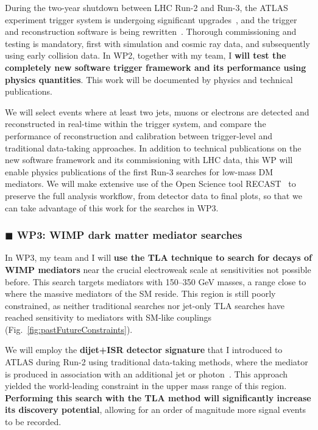 \documentclass[11pt,a4paper]{article}
\begin{document}
During the two-year shutdown between LHC Run-2 and Run-3, the ATLAS experiment trigger system is undergoing significant upgrades~\cite{Aad:1602235}, and the trigger and reconstruction software is being rewritten~\cite{Bielski:2674286}. %
Thorough commissioning and testing is mandatory, first with simulation and cosmic ray data, and subsequently using early collision data. 
In WP2, together with my team, I \textbf{will test the completely new software trigger framework and its performance using physics quantities}.
This work will be documented by physics and technical publications.  

We will select events where at least two jets, muons or electrons are detected and reconstructed in real-time within the trigger system, and compare the performance of reconstruction and calibration between trigger-level and traditional data-taking approaches. 
In addition to technical publications on the new software framework and its commissioning with LHC data, this WP will enable physics publications of the first Run-3 searches for low-mass DM mediators. 
We will make extensive use of the Open Science tool RECAST~\cite{Schuy:2019awp} to preserve the full analysis workflow, from detector data to final plots, so that we can take advantage of this work for the searches in WP3.  

\subsubsection*{\color{yellow} $\blacksquare$ \color{black} WP3: WIMP dark matter mediator searches}

In WP3, my team and I will \textbf{use the TLA technique to search for decays of WIMP mediators} near the crucial electroweak scale at sensitivities not possible before.
This search targets mediators with 150--350 GeV masses, a range close to where the massive mediators of the SM reside. This region is still poorly constrained, as neither traditional searches nor jet-only TLA searches have reached sensitivity to mediators with SM-like couplings (Fig.~\ref{fig:pastFutureConstraints}).  

We will employ the \textbf{dijet+ISR detector signature} that I introduced to ATLAS during Run-2 using traditional data-taking methods, where the mediator is produced in association with an additional jet or photon~\cite{Aaboud:2019zxd}. 
This approach yielded the world-leading constraint in the upper mass range of this region. 
\textbf{Performing this search with the TLA method will significantly increase its discovery potential}, 
allowing for an order of magnitude more signal events to be recorded.%
\end{document}
